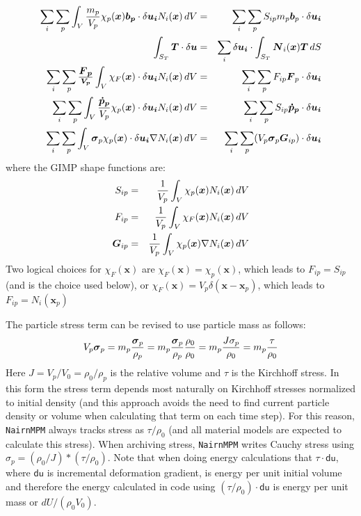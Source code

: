 \documentclass[11pt]{article}
\renewcommand{\vec}[1]{\boldsymbol{#1}}
\newcommand{\tens}[1]{\boldsymbol{\mathsf{#1}}}
\begin{document}
\begin{eqnarray}
   \sum_i\sum_p \int_V {m_p\over V_p} \chi_p(\vec x)\vec{b_p}\cdot \delta\vec{u_i} N_i(\vec x)\thinspace dV
    & = & \sum_i\sum_p S_{ip} m_p \vec b_p \cdot \delta\vec{u_i} \\
    \int_{S_T}\vec T \cdot \delta\vec u & = & \sum_i \delta\vec{u_i}\cdot \int_{S_T}\vec N_i(\vec x) \vec T \thinspace dS \\
    \sum_i\sum_p \vec {\vec F_p\over V_p} \int_V \chi_F(\vec x) \cdot \delta\vec{u_i} N_i(\vec x)\thinspace dV
    & = &  \sum_i\sum_p F_{ip} \vec F_p \cdot \delta\vec{u_i} \\
   \sum_i \sum_p\int_V {\vec{\dot p_p}\over V_p} \chi_p(\vec x)\cdot \delta\vec{u_i} N_i(\vec x)\thinspace dV
   & = &  \sum_i\sum_p S_{ip} \vec{\dot p_p} \cdot \delta\vec{u_i} \\
   \sum_i\sum_p\int_V \tens\sigma_p \chi_p(\vec x) \cdot \delta\vec{u_i} \nabla N_i(\vec x)\thinspace dV
   & = &  \sum_i\sum_p (V_p\tens\sigma_p \vec G_{ip} )\cdot \delta\vec{u_i}
\end{eqnarray}
where the GIMP shape functions are:
\begin{eqnarray}
     S_{ip} & = & {1\over V_p} \int_V \chi_p(\vec x) N_i(\vec x)\thinspace dV    \label{Sipdef} \\
     F_{ip} & = & {1\over V_p} \int_V \chi_F(\vec x) N_i(\vec x)\thinspace dV  \\
     \vec G_{ip} & = & {1\over V_p} \int_V \chi_p(\vec x) \nabla N_i(\vec x)\thinspace dV   \label{Gipdef}
\end{eqnarray}
Two logical choices for $\chi_F(\vec x)$ are $\chi_F(\vec x) = \chi_p(\vec x)$, which leads to $F_{ip} = S_{ip}$ (and is the choice used below), or  $\chi_F(\vec x) = V_p\delta(\vec x-\vec x_p)$, which leads to $F_{ip} = N_i(\vec x_p)$

The particle stress term can be revised to use particle mass as follows:
\begin{equation}
     V_p\tens\sigma_p = m_p {\tens\sigma_p\over\rho_p} = m_p {\tens\sigma_p\over\rho_p} {\rho_0\over\rho_0} = m_p {J\sigma_p\over\rho_0} = m_p{\tau\over\rho_0}
\end{equation}
Here $J = V_p/V_0 = \rho_0/\rho_p$ is the relative volume and $\tens\tau$ is the Kirchhoff stress. In this form the stress term depends most naturally on Kirchhoff stresses normalized to initial density (and this approach avoids the need to find current particle density or volume when calculating that term on each time step). For this reason, {\tt NairnMPM} always tracks stress as  $\tens\tau/\rho_0$ (and all material models are expected to calculate this stress). When archiving stress, {\tt NairnMPM} writes Cauchy stress using $\tens\sigma_p = (\rho_0/J)*(\tau/\rho_0)$. Note that when doing energy calculations that $\tens\tau \cdot \tens{du}$, where $\tens{du}$ is incremental deformation gradient, is energy per unit initial volume and therefore the energy calculated in code using  $(\tau/\rho_0) \cdot \tens{du}$ is energy per unit mass or $dU/(\rho_0V_0)$.
\end{document}
